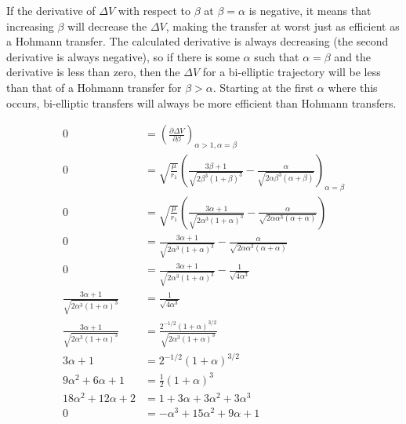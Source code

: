 \documentclass{article}
\begin{document}
If the derivative of $\Delta V$ with respect to $\beta$ at $\beta=\alpha$ is negative, it means that increasing $\beta$ will decrease the $\Delta V$, making the transfer at worst just as efficient as a Hohmann transfer. The calculated derivative is always decreasing (the second derivative is always negative), so if there is some $\alpha$ such that $\alpha=\beta$ and the derivative is less than zero, then the $\Delta V$ for a bi-elliptic trajectory will be less than that of a Hohmann transfer for $\beta>\alpha$. Starting at the first $\alpha$ where this occurs, bi-elliptic transfers will always be more efficient than Hohmann transfers.

\begin{align*}
    0                                              & = \left(\frac{\partial\Delta V}{\partial\beta}\right)_{\alpha>1,\alpha=\beta}                                                                      \\
    0                                              & = \sqrt{\frac{\mu}{r_1}}\left(\frac{3\beta+1}{\sqrt{2\beta^3(1+\beta)^3}}-\frac{\alpha}{\sqrt{2\alpha\beta^3(\alpha+\beta)}}\right)_{\alpha=\beta} \\
    0                                              & =\sqrt{\frac{\mu}{r_1}}\left(\frac{3\alpha+1}{\sqrt{2\alpha^3(1+\alpha)^3}}-\frac{\alpha}{\sqrt{2\alpha\alpha^3(\alpha+\alpha)}}\right)            \\
    0                                              & =\frac{3\alpha+1}{\sqrt{2\alpha^3(1+\alpha)^3}}-\frac{\alpha}{\sqrt{2\alpha\alpha^3(\alpha+\alpha)}}                                               \\
    0                                              & =\frac{3\alpha+1}{\sqrt{2\alpha^3(1+\alpha)^3}}-\frac{1}{\sqrt{4\alpha^3}}                                                                         \\
    \frac{3\alpha+1}{\sqrt{2\alpha^3(1+\alpha)^3}} & =\frac{1}{\sqrt{4\alpha^3}}                                                                                                                        \\
    \frac{3\alpha+1}{\sqrt{2\alpha^3(1+\alpha)^3}} & =\frac{2^{-1/2}(1+\alpha)^{3/2}}{\sqrt{2\alpha^3(1+\alpha)^3}}                                                                                     \\
    3\alpha+1                                      & =2^{-1/2}(1+\alpha)^{3/2}                                                                                                                          \\
    9\alpha^2+6\alpha+1                            & =\frac{1}{2}(1+\alpha)^3                                                                                                                           \\
    18\alpha^2+12\alpha+2                          & =1+3\alpha+3\alpha^2+3\alpha^3                                                                                                                     \\
    0                                              & =-\alpha^3+15\alpha^2+9\alpha+1
\end{align*}
\end{document}
